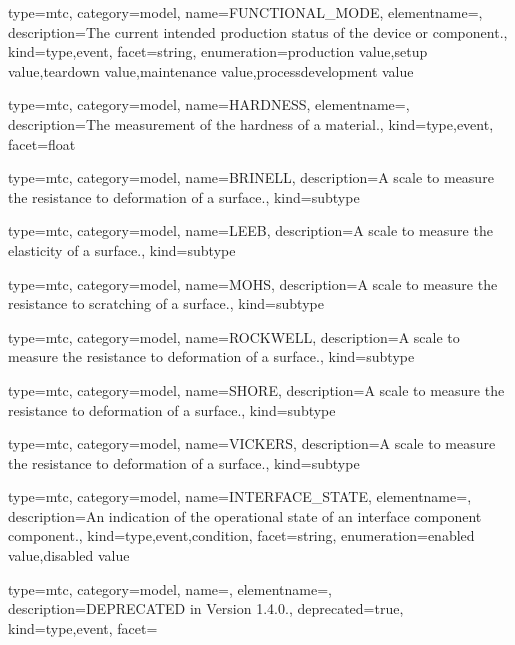 {
  type=mtc,
  category=model,
  name={FUNCTIONAL\_MODE},
  elementname=,
  description={The current intended production status of the device or component.},
  kind={type,event},
  facet={\gls{string}},
  enumeration={\gls{production value},\gls{setup value},\gls{teardown value},\gls{maintenance value},\gls{processdevelopment value}}
}


{
  type=mtc,
  category=model,
  name={HARDNESS},
  elementname=,
  description={The measurement of the hardness of a material.},
  kind={type,event},
  facet={\gls{float}}
}


{
  type=mtc,
  category=model,
  name={BRINELL},
  description={A scale to measure the resistance to deformation of a surface.},
  kind={subtype}
}


{
  type=mtc,
  category=model,
  name={LEEB},
  description={A scale to measure the elasticity of a surface.},
  kind={subtype}
}


{
  type=mtc,
  category=model,
  name={MOHS},
  description={A scale to measure the resistance to scratching of a surface.},
  kind={subtype}
}


{
  type=mtc,
  category=model,
  name={ROCKWELL},
  description={A scale to measure the resistance to deformation of a surface.},
  kind={subtype}
}


{
  type=mtc,
  category=model,
  name={SHORE},
  description={A scale to measure the resistance to deformation of a surface.},
  kind={subtype}
}


{
  type=mtc,
  category=model,
  name={VICKERS},
  description={A scale to measure the resistance to deformation of a surface.},
  kind={subtype}
}


{
  type=mtc,
  category=model,
  name={INTERFACE\_STATE},
  elementname=,
  description={An indication of the operational state of an \gls{interface component} component.},
  kind={type,event,condition},
  facet={\gls{string}},
  enumeration={\gls{enabled value},\gls{disabled value}}
}


{
  type=mtc,
  category=model,
  name=,
  elementname=,
  description={DEPRECATED in Version 1.4.0.},
  deprecated={true},
  kind={type,event},
  facet={}
}



